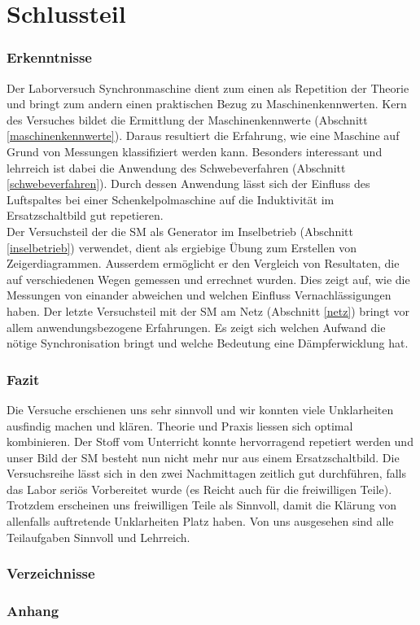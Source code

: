 \part{Schlussteil}



\section{Erkenntnisse}
Der Laborversuch \flqq{}Synchronmaschine\frqq{} dient zum einen als Repetition der Theorie und bringt zum andern einen praktischen Bezug zu Maschinenkennwerten. Kern des Versuches bildet die Ermittlung der Maschinenkennwerte (Abschnitt \ref{maschinenkennwerte}). Daraus resultiert die Erfahrung, wie eine Maschine auf Grund von Messungen klassifiziert werden kann. Besonders interessant und lehrreich ist dabei die Anwendung des Schwebeverfahren (Abschnitt \ref{schwebeverfahren}). Durch dessen Anwendung lässt sich der Einfluss des Luftspaltes bei einer Schenkelpolmaschine auf die Induktivität im Ersatzschaltbild gut repetieren.\\
Der Versuchsteil der die SM als Generator im Inselbetrieb (Abschnitt \ref{inselbetrieb}) verwendet, dient als ergiebige Übung zum Erstellen von Zeigerdiagrammen. Ausserdem ermöglicht er den Vergleich von Resultaten, die auf verschiedenen Wegen gemessen und errechnet wurden. Dies zeigt auf, wie die Messungen von einander abweichen und welchen Einfluss Vernachlässigungen haben. Der letzte Versuchsteil mit der SM am Netz (Abschnitt \ref{netz}) bringt vor allem anwendungsbezogene Erfahrungen. Es zeigt sich welchen Aufwand die nötige Synchronisation bringt und welche Bedeutung eine Dämpferwicklung hat.   


\section{Fazit} %
Die Versuche erschienen uns sehr sinnvoll und wir konnten viele Unklarheiten ausfindig machen und klären. Theorie und Praxis liessen sich optimal kombinieren. Der Stoff vom Unterricht konnte hervorragend repetiert werden und unser Bild der SM besteht nun nicht mehr nur aus einem Ersatzschaltbild. Die Versuchsreihe lässt sich in den zwei Nachmittagen zeitlich gut durchführen, falls das Labor seriös Vorbereitet wurde (es Reicht auch für die freiwilligen Teile). Trotzdem erscheinen uns freiwilligen Teile als Sinnvoll, damit die Klärung von allenfalls auftretende Unklarheiten Platz haben. Von uns ausgesehen sind alle Teilaufgaben Sinnvoll und Lehrreich.



\section{Verzeichnisse}

\listoffigures

\section{Anhang}